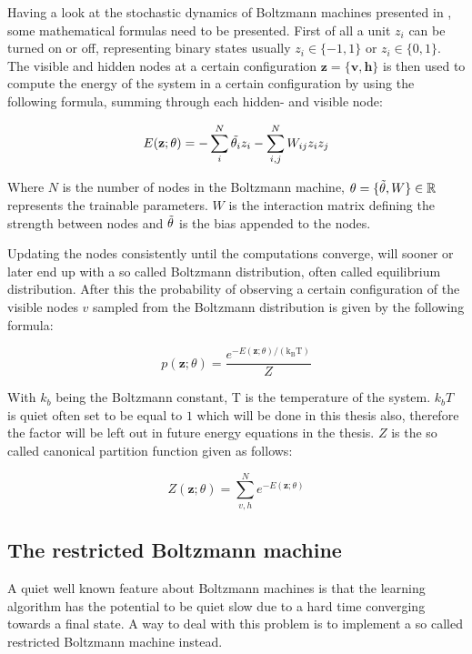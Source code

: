 \documentclass[../main.tex]{subfiles}
\begin{document}
Having a look at the stochastic dynamics of Boltzmann machines presented in \cite{Hinton:2007}, some mathematical formulas need to be presented. First of all a unit $z_i$ can be turned on or off, representing binary states usually $z_i\in\{-1,1\}$ or $z_i\in\{0,1\}$. The visible and hidden nodes at a certain configuration $\mathbf{z}=\{\mathbf{v},\mathbf{h}\}$ is then used to compute the energy of the system in a certain configuration by using the following formula, summing through each hidden- and visible node:

\begin{equation*}
    E(\mathbf{z}; \theta) = -\sum_i^N \Tilde{\theta_i}z_i-\sum_{i,j}^N W_{ij}z_iz_j
\end{equation*}

Where $N$ is the number of nodes in the Boltzmann machine, $\theta=\{\Tilde{\theta}, W\}\in\mathbb{R}$ represents the trainable parameters. $W$ is the interaction matrix defining the strength between nodes and $\Tilde{\theta}$ is the bias appended to the nodes.

Updating the nodes consistently until the computations converge, will sooner or later end up with a so called Boltzmann distribution, often called equilibrium distribution. After this the probability of observing a certain configuration of the visible nodes $v$ sampled from the Boltzmann distribution is given by the following formula:

\begin{equation*}
    p(\mathbf{z}; \theta)=\frac{e^{-E(\mathbf{z}; \theta) /\left(\mathrm{k}_{\mathrm{B}} \mathrm{T}\right)}}{Z}
\end{equation*}

With $k_b$ being the Boltzmann constant, T is the temperature of the system. $k_b T$ is quiet often set to be equal to $1$ which will be done in this thesis also, therefore the factor will be left out in future energy equations in the thesis. $Z$ is the so called canonical partition function given as follows:

\begin{equation*}
Z(\mathbf{z}; \theta)=\sum_{v, h}^N e^{-E(\mathbf{z}; \theta)}
\end{equation*}

\subsection{The restricted Boltzmann machine}
A quiet well known feature about Boltzmann machines is that the learning algorithm has the potential to be quiet slow due to a hard time converging towards a final state\cite{Hinton:2007}. A way to deal with this problem is to implement a so called restricted Boltzmann machine instead.
\end{document}
